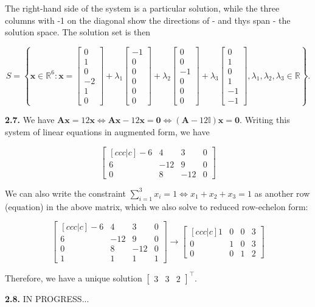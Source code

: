 \documentclass{article}
\def\ma{{\bm{A}}}
\def\R{{\mathbb{R}}}
\def\I{{\mathbb{I}}}
\newcommand{\matr}[1]{\bm{#1}}
\begin{document}
The right-hand side of the system is a particular solution, while the three columns with -1 on the diagonal show the directions of - and thys span - the solution space. The solution set is then

\[
S = \left\{\matr{x} \in \R^6: \matr{x} = \begin{bmatrix}
    0\\1\\0\\-2\\1\\0
\end{bmatrix} + \lambda_1\begin{bmatrix}
    -1\\0\\0\\0\\0\\0
\end{bmatrix} + \lambda_2\begin{bmatrix}
    0\\0\\-1\\0\\0\\0
\end{bmatrix} + \lambda_3\begin{bmatrix}
    0\\1\\0\\1\\-1\\-1
\end{bmatrix}, \lambda_1, \lambda_2, \lambda_3 \in \R\right\}.
\]

\textbf{2.7.} We have $\ma\matr{x} = 12\matr{x} \iff \ma\matr{x} - 12\matr{x} = \matr{0} \iff (\ma - 12\I)\matr{x} = \matr{0}$. Writing this system of linear equations in augmented form, we have

\[
\begin{bmatrix}[c c c | c]
    -6 & 4 & 3 & 0\\
    6 & -12 & 9 & 0\\
    0 & 8 & -12 & 0
\end{bmatrix}
\]

We can also write the constraint $\sum_{i = 1}^3 x_i = 1 \iff x_1 + x_2 + x_3 = 1$ as another row (equation) in the above matrix, which we also solve to reduced row-echelon form:

\[
\begin{bmatrix}[c c c | c]
    -6 & 4 & 3 & 0\\
    6 & -12 & 9 & 0\\
    0 & 8 & -12 & 0\\
    1 & 1 & 1 & 1
\end{bmatrix} \rightarrow
\begin{bmatrix}[c c c | c]
    1 & 0 & 0 & 3\\
    0 & 1 & 0 & 3\\
    0 & 0 & 1 & 2
\end{bmatrix}
\]

Therefore, we have a unique solution $\begin{bmatrix}
    3 & 3 & 2
\end{bmatrix}^\top$.

\textbf{2.8.} IN PROGRESS...
\end{document}
